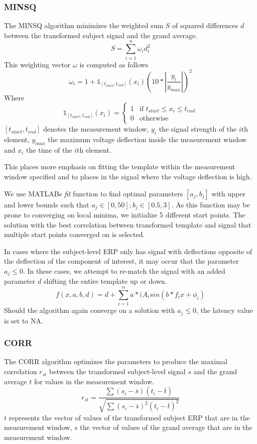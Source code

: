 \documentclass[
  man,floatsintext]{apa7}
\begin{document}
\hypertarget{minsq}{%
\subsubsection{MINSQ}\label{minsq}}

The MINSQ algorithm minimizes the weighted sum \(S\) of squared differences \(d\) between the transformed subject signal and the grand average.
\[S = \sum_{i = 1}^{n}\omega_{i}d_{i}^2\]
This weighting vector \(\omega\) is computed as follows
\[\omega_i = 1+\mathbb{1}_{[t_{start}, t_{end}]}(x_i)(10 * |\frac{y_i}{y_{max}}|)^2\]
Where
\[\mathbb{1}_{[t_{start}, t_{end}]}(x_i) = \begin{cases} 1 & \text{if $t_{start} \le x_i \le t_{end}$} \\ 0 & \text{otherwise}\end{cases}\]\([t_{start}, t_{end}]\) denotes the measurement window, \(y_{i}\) the signal strength of the \(i\)th element, \(y_{max}\) the maximum voltage deflection inside the measurement window and \(x_i\) the time of the \(i\)th element.

This places more emphasis on fitting the template within the measurement window specified and to places in the signal where the voltage deflection is high.

We use MATLABs \emph{fit} function to find optimal parameters \([a_j, b_j]\) with upper and lower bounds such that \(a_j \in [0, 50]; b_j \in [0.5, 3]\). As this function may be prone to converging on local minima, we initialize 5 different start points. The solution with the best correlation between transformed template and signal that multiple start points converged on is selected.

In cases where the subject-level ERP only has signal with deflections opposite of the deflection of the component of interest, it may occur that the parameter \(a_j \le 0\). In these cases, we attempt to re-match the signal with an added parameter \(d\) shifting the entire template up or down.
\[f(x, a,b, d) = d +\sum_{i = 1}^{n} a*(A_isin(b*f_ix + \phi_i)\]
Should the algorithm again converge on a solution with \(a_j \le 0\), the latency value is set to NA.

\hypertarget{corr}{%
\subsubsection{CORR}\label{corr}}

The CORR algorithm optimizes the parameters to produce the maximal correlation \(r_{st}\) between the transformed subject-level signal \(s\) and the grand average \(t\) for values in the measurement window.
\[r_{st} = \frac{\sum(s_i - \bar{s})(t_{i} - \bar{t})}{\sqrt{\sum(s_i - \bar{s})^2(t_{i} - \bar{t})^2}}\]
\(t\) represents the vector of values of the transformed subject ERP that are in the measurement window, \(s\) the vector of values of the grand average that are in the measurement window.
\end{document}
